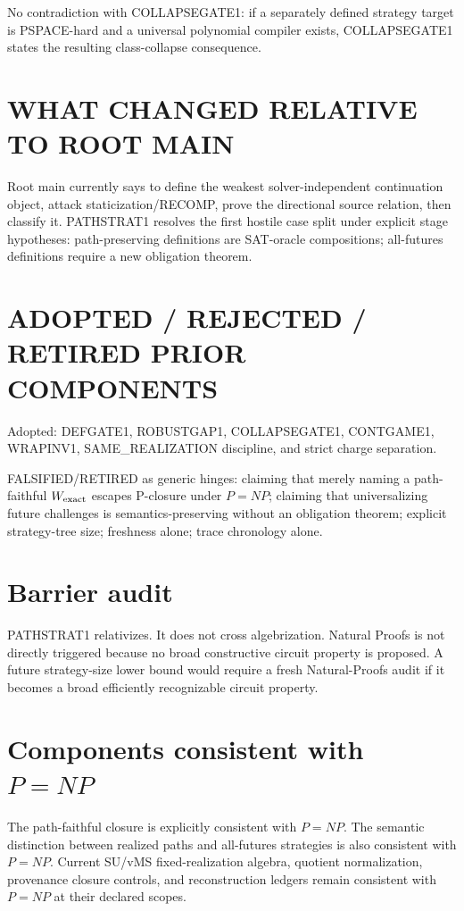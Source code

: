 \documentclass[11pt]{article}
\begin{document}
No contradiction with COLLAPSEGATE1: if a separately defined strategy target is PSPACE-hard and a universal polynomial compiler exists, COLLAPSEGATE1 states the resulting class-collapse consequence.

\section*{WHAT CHANGED RELATIVE TO ROOT MAIN}
Root main currently says to define the weakest solver-independent continuation object, attack staticization/RECOMP, prove the directional source relation, then classify it. PATHSTRAT1 resolves the first hostile case split under explicit stage hypotheses: path-preserving definitions are SAT-oracle compositions; all-futures definitions require a new obligation theorem.

\section*{ADOPTED / REJECTED / RETIRED PRIOR COMPONENTS}
Adopted: DEFGATE1, ROBUSTGAP1, COLLAPSEGATE1, CONTGAME1, WRAPINV1, SAME\_REALIZATION discipline, and strict charge separation.

FALSIFIED/RETIRED as generic hinges: claiming that merely naming a path-faithful $W_{\rm exact}$ escapes P-closure under $P=NP$; claiming that universalizing future challenges is semantics-preserving without an obligation theorem; explicit strategy-tree size; freshness alone; trace chronology alone.

\section*{Barrier audit}
PATHSTRAT1 relativizes. It does not cross algebrization. Natural Proofs is not directly triggered because no broad constructive circuit property is proposed. A future strategy-size lower bound would require a fresh Natural-Proofs audit if it becomes a broad efficiently recognizable circuit property.

\section*{Components consistent with $P=NP$}
The path-faithful closure is explicitly consistent with $P=NP$. The semantic distinction between realized paths and all-futures strategies is also consistent with $P=NP$. Current SU/vMS fixed-realization algebra, quotient normalization, provenance closure controls, and reconstruction ledgers remain consistent with $P=NP$ at their declared scopes.
\end{document}
